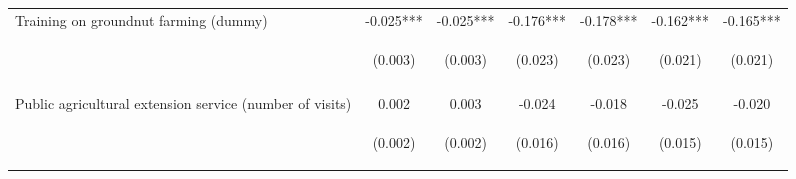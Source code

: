 \begin{center}
\begin{tabular}{lcccccc}
Training on groundnut farming (dummy) & -0.025*** & -0.025*** & -0.176*** & -0.178*** & -0.162*** & -0.165*** \\
 & \begin{footnotesize}(0.003)\end{footnotesize} & \begin{footnotesize}(0.003)\end{footnotesize} & \begin{footnotesize}(0.023)\end{footnotesize} & \begin{footnotesize}(0.023)\end{footnotesize} & \begin{footnotesize}(0.021)\end{footnotesize} & \begin{footnotesize}(0.021)\end{footnotesize} \\
\vspace{4pt} & \begin{footnotesize}[0.000]\end{footnotesize} & \begin{footnotesize}[0.000]\end{footnotesize} & \begin{footnotesize}[0.000]\end{footnotesize} & \begin{footnotesize}[0.000]\end{footnotesize} & \begin{footnotesize}[0.000]\end{footnotesize} & \begin{footnotesize}[0.000]\end{footnotesize} \\
Public agricultural extension service (number of visits) & 0.002 & 0.003 & -0.024 & -0.018 & -0.025 & -0.020 \\
 & \begin{footnotesize}(0.002)\end{footnotesize} & \begin{footnotesize}(0.002)\end{footnotesize} & \begin{footnotesize}(0.016)\end{footnotesize} & \begin{footnotesize}(0.016)\end{footnotesize} & \begin{footnotesize}(0.015)\end{footnotesize} & \begin{footnotesize}(0.015)\end{footnotesize} \\

\end{tabular}
\end{center}
